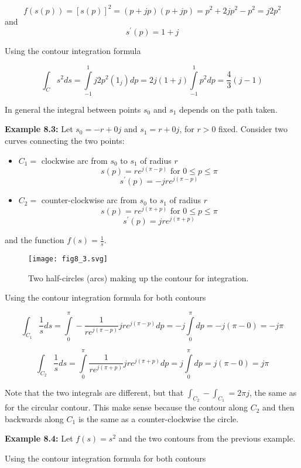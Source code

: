 \documentclass{article}
\begin{document}
\[
f\left(s(p)\right) = [s(p)]^2 = (p + jp)(p + jp) = p^2 + 2jp^2 -p^2 = j2p^2
\]
and
\[
s^\prime(p) = 1 + j
\]

Using the contour integration formula

\[
\int_C s^2 ds = \int\limits_{-1}^{1} j2p^2(1_j) dp = 2j(1+j) \int\limits_{-1}^{1} p^2 dp = \frac{4}{3} (j-1) 
\]

In general the integral between points $s_0$ and $s_1$ depends on the path taken.

\textbf{Example 8.3:} Let $s_0 = -r + 0j$ and $s_1 = r + 0j$, for $r > 0$ fixed. Consider two curves connecting the two points:

\begin{itemize}
\item $C_1 = $ clockwise arc from $s_0$ to $s_1$ of radius $r$
  \[
  s(p) = re^{j(\pi - p)} \text{ for } 0 \leq p \leq \pi  
  \]
  \[
  s^\prime(p) = -jre^{j(\pi - p)}
  \]
\item $C_2 = $ counter-clockwise arc from $s_0$ to $s_1$ of radius $r$
  \[
  s(p) = re^{j(\pi + p)} \text{ for } 0 \leq p \leq \pi
  \]
  \[
  s^\prime(p) = jre^{j(\pi + p)}
  \]
\end{itemize}

and the function $f(s) = \frac{1}{s}$.

\begin{figure}
  \centering
  \texttt{[image: fig8\_3.svg]}
  \caption{Two half-circles (arcs) making up the contour for integration.}
\end{figure}

Using the contour integration formula for both contours

\[
\int_{C_1} \frac{1}{s} ds = \int\limits_{0}^{\pi} - \frac{1}{re^{j(\pi - p)}} jre^{j(\pi - p)} dp =  -j \int\limits_{0}^{\pi} dp = -j(\pi - 0) = - j\pi
\]

\[
\int_{C_2}  \frac{1}{s} ds = \int\limits_{0}^{\pi} \frac{1}{re^{j(\pi + p)}} jre^{j(\pi + p)}  dp =  j \int\limits_{0}^{\pi} dp = j(\pi - 0) = j\pi
\]

Note that the two integrals are different, but that $\int_{C_2} - \int_{C_1} = 2\pi j$, the same as for the circular contour. This make sense because the contour along $C_2$ and then backwards along $C_1$ is the same as a counter-clockwise the circle.

\textbf{Example 8.4:} Let $f(s) = s^2$ and the two contours from the previous example.

Using the contour integration formula for both contours
\end{document}
